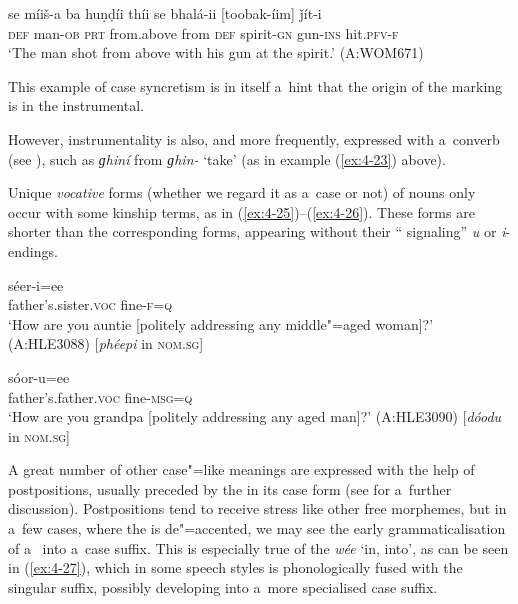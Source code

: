 \begin{exe}
\ex
\label{ex:4-24}
\gll se míiš-a ba huṇḍíi thíi se bhalá-ii [toobak-íim] ǰít-i \\
	\textsc{def} man-\textsc{ob} \textsc{prt} from.above from \textsc{def} spirit-\textsc{gn} gun-\textsc{ins} hit.\textsc{pfv-f}\\
\glt `The man shot from above with his gun at the spirit.' (A:WOM671)
\end{exe}

This example of case syncretism is in itself a~hint that the origin of the  marking is in the instrumental. 


However, instrumentality is also, and more frequently, expressed with a~converb (see ), such as \textit{ɡhiní} from \textit{ɡhin-} `take' (as in example (\ref{ex:4-23}) above).


Unique \textit{vocative} forms (whether we regard it as a~case or not) of nouns only occur with some kinship terms, as in (\ref{ex:4-25})--(\ref{ex:4-26}). These forms are shorter than the corresponding  forms, appearing without their `` signaling'' \textit{u} or \textit{i}-endings.


\begin{exe}
\ex
\label{ex:4-25}
\gll [phéep] séer-i=ee \\
	father's.sister.\textsc{voc} fine-\textsc{f=q} \\
\glt `How are you auntie [politely addressing any middle"=aged woman]?' (A:HLE3088) [\textit{phéepi} in \textsc{nom.sg}]
\end{exe}

\begin{exe}
\ex
\label{ex:4-26}
 \gll [dóod] sóor-u=ee \\
	father's.father.\textsc{voc} fine-\textsc{msg=q} \\
\glt `How are you grandpa [politely addressing any aged man]?' (A:HLE3090) [\textit{dóodu} in \textsc{nom.sg}]
\end{exe}

A great number of other case"=like meanings are expressed with the help of postpositions, usually
preceded by the  in its  case form (see  for a~further discussion). Postpositions
tend to receive stress like other free morphemes, but in a~few cases, where the  is
de"=accented, we may see the early grammaticalisation of a~ into a~case suffix. This is
especially true of the  \textit{wée} `in, into', as can be seen in (\ref{ex:4-27}),
which in some speech styles is phonologically fused with the singular  suffix, possibly
developing into a~more specialised  case suffix.

